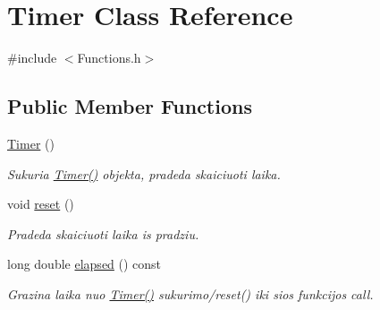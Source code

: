 \hypertarget{class_timer}{}\section{Timer Class Reference}
\label{class_timer}


{\ttfamily \#include $<$Functions.\+h$>$}

\subsection*{Public Member Functions}
\begin{DoxyCompactItemize}
\item 
\mbox{\label{class_timer_a5f16e8da27d2a5a5242dead46de05d97}} 
\mbox{\hyperlink{class_timer_a5f16e8da27d2a5a5242dead46de05d97}{Timer}} ()
\begin{DoxyCompactList}\small\item\em Sukuria \mbox{\hyperlink{class_timer_a5f16e8da27d2a5a5242dead46de05d97}{Timer()}} objekta, pradeda skaiciuoti laika. \end{DoxyCompactList}\item 
\mbox{\label{class_timer_a9020542d73357a4eef512eefaf57524b}} 
void \mbox{\hyperlink{class_timer_a9020542d73357a4eef512eefaf57524b}{reset}} ()
\begin{DoxyCompactList}\small\item\em Pradeda skaiciuoti laika is pradziu. \end{DoxyCompactList}\item 
\mbox{\label{class_timer_a4448fdb80f00982236dd8db16bf50fea}} 
long double \mbox{\hyperlink{class_timer_a4448fdb80f00982236dd8db16bf50fea}{elapsed}} () const
\begin{DoxyCompactList}\small\item\em Grazina laika nuo \mbox{\hyperlink{class_timer_a5f16e8da27d2a5a5242dead46de05d97}{Timer()}} sukurimo/reset() iki sios funkcijos call. \end{DoxyCompactList}\end{DoxyCompactItemize}
